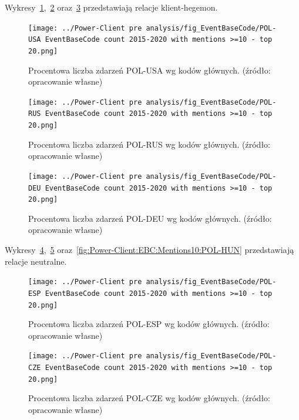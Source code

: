 \documentclass[11pt]{report}
\begin{document}
    Wykresy~\ref{fig:Power-Client:EBC:Mentions10:POL-USA},~\ref{fig:Power-Client:EBC:Mentions10:POL-RUS} oraz~\ref{fig:Power-Client:EBC:Mentions10:POL-DEU} przedstawiają relacje klient-hegemon.
    \begin{figure}[!htp]
        \centering
        \texttt{[image: ../Power-Client pre analysis/fig\_EventBaseCode/POL-USA EventBaseCode count 2015-2020 with mentions >=10 - top 20.png]}
        \caption{Procentowa liczba zdarzeń POL-USA wg kodów głównych. (źródło: opracowanie własne)}
        \label{fig:Power-Client:EBC:Mentions10:POL-USA}
    \end{figure}

    \begin{figure}[!htp]
        \centering
        \texttt{[image: ../Power-Client pre analysis/fig\_EventBaseCode/POL-RUS EventBaseCode count 2015-2020 with mentions >=10 - top 20.png]}
        \caption{Procentowa liczba zdarzeń POL-RUS wg kodów głównych. (źródło: opracowanie własne)}
        \label{fig:Power-Client:EBC:Mentions10:POL-RUS}
    \end{figure}

    \begin{figure}[!htp]
        \centering
        \texttt{[image: ../Power-Client pre analysis/fig\_EventBaseCode/POL-DEU EventBaseCode count 2015-2020 with mentions >=10 - top 20.png]}
        \caption{Procentowa liczba zdarzeń POL-DEU wg kodów głównych. (źródło: opracowanie własne)}
        \label{fig:Power-Client:EBC:Mentions10:POL-DEU}
    \end{figure}

    Wykresy~\ref{fig:Power-Client:EBC:Mentions10:POL-ESP},~\ref{fig:Power-Client:EBC:Mentions10:POL-CZE} oraz~\ref{fig:Power-Client:EBC:Mentions10:POL-HUN} przedstawiają relacje neutralne.
    \begin{figure}[!htp]
        \centering
        \texttt{[image: ../Power-Client pre analysis/fig\_EventBaseCode/POL-ESP EventBaseCode count 2015-2020 with mentions >=10 - top 20.png]}
        \caption{Procentowa liczba zdarzeń POL-ESP wg kodów głównych. (źródło: opracowanie własne)}
        \label{fig:Power-Client:EBC:Mentions10:POL-ESP}
    \end{figure}

    \begin{figure}[!htp]
        \centering
        \texttt{[image: ../Power-Client pre analysis/fig\_EventBaseCode/POL-CZE EventBaseCode count 2015-2020 with mentions >=10 - top 20.png]}
        \caption{Procentowa liczba zdarzeń POL-CZE wg kodów głównych. (źródło: opracowanie własne)}
        \label{fig:Power-Client:EBC:Mentions10:POL-CZE}
    \end{figure}
\end{document}

